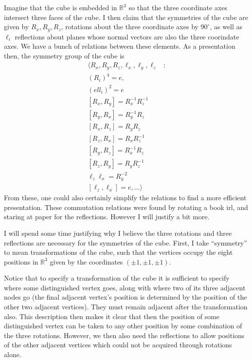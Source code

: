 \documentclass[12pt,letterpaper,boxed]{hmcpset}
\newcommand{\R}{\mathbb R}
\newcommand{\inv}{^{-1}}
\begin{document}
\begin{solution}
Imagine that the cube is embedded in $\R^3$ so that the three
coordinate axes intersect three faces of the cube. I then claim that
the symmetries of the cube are given by $R_x, R_y, R_z$, rotations
about the three coordinate axes by $90^\circ$, as well as $\ell_i$ reflections
about planes whose normal vectors are also the three coorindate
axes. We have a bunch of relations between these elements.
As a presentation then, the symmetry group of the cube is
\begin{align*}
	\langle 
		R_x, R_y, R_z, \ell_x, \ell_y, \ell_z &: \\
		(R_i)^4 = e, \\
		(ell_i)^2 = e \\
		[R_x,R_y] = R_x\inv R_z\inv \\
		[R_y, R_x] = R_y\inv R_z\\
		[R_x, R_z] = R_yR_z \\
		[R_z, R_x] = R_xR_z\inv \\
		[R_y, R_z] = R_x\inv R_z \\
		[R_z, R_y] = R_yR_z\inv \\
		\ell_z\ell_x = R_y^{-2} \\
		[\ell_z, \ell_x] = e, 
		...   
	\rangle
\end{align*}
From these, one could also certainly simplify the relations to find
a more efficient presentation. These commutation relations were found
by rotating a book irl, and staring at paper for the reflections.
However I will justify a bit more. 

I will spend some time justifying why I believe the three
rotations and three reflections
are necessary for the symmetries of the cube.
First, I take ``symmetry'' to mean transformations of the cube, such
that the vertices occupy the eight positions in $\R^3$ given by the
coordinates $(\pm 1, \pm 1, \pm 1)$. 

Notice that to specify a transformation of the cube it is sufficient
to specify where some distinguished vertex goes, along with where two 
of its three adjacent nodes go (the final adjacent vertex's position is
determined by the position of the other two adjacent vertices). 
They must remain adjacent after the transformation also. 
This description then makes it clear that then the position of some
distinguished vertex can be taken to any other position by some
combination of the three rotations. However, we then also need the
reflections to allow positions of the other adjacent vertices which
could not be acquired through rotations alone.


\end{solution}
\end{document}
